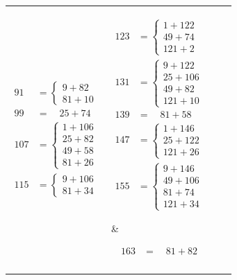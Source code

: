 \documentclass[12pt]{article}
\begin{document}
\begin{tabular}{l|l|l|l}
{\begin{align*}
        91 &= \begin{cases}
          9 + 82 \\ 81 + 10
        \end{cases} \\
        99 &= \quad \! 25 + 74 \\
        107 &= \begin{cases}
          1 + 106 \\ 25 + 82 \\ 49 + 58 \\ 81 + 26
        \end{cases} \\
        115 &= \begin{cases}
          9 + 106 \\ 81 + 34
        \end{cases}
    \end{align*}} &
\parbox[t]{0.2\linewidth}{%
  \vspace*{-\baselineskip}
    \begin{align*} 
        123 &= \begin{cases}
          1 + 122 \\ 49 + 74 \\ 121 + 2 
        \end{cases} \\
        131 &= \begin{cases}
          9 + 122 \\ 25 + 106 \\ 49 + 82 \\ 121 + 10
        \end{cases} \\
        139 &= \quad \! 81 + 58 \\
        147 &= \begin{cases}
          1 + 146 \\ 25 + 122 \\ 121 + 26
        \end{cases} \\
        155 &= \begin{cases}
          9 + 146 \\ 49 + 106 \\ 81 + 74 \\ 121 + 34
        \end{cases}
    \end{align*}} &  
\parbox[t]{0.2\linewidth}{%
  \vspace*{-\baselineskip}
    \begin{align*} 
        163 &= \quad \! 81 + 82 \\

\end{align*}}
\end{tabular}
\end{document}
